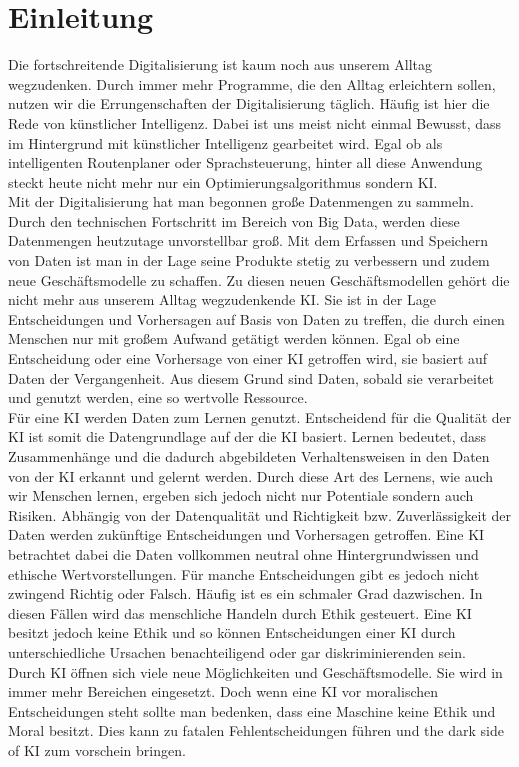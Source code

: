 \chapter{Einleitung}
\begin{onehalfspace}    
    \label{sec:einleitung}
        Die fortschreitende Digitalisierung ist kaum noch aus unserem Alltag wegzudenken. Durch immer mehr Programme, die den Alltag erleichtern sollen, nutzen wir die Errungenschaften der Digitalisierung täglich. Häufig ist hier die Rede von künstlicher Intelligenz. Dabei ist uns meist nicht einmal Bewusst, dass im Hintergrund mit künstlicher Intelligenz gearbeitet wird. Egal ob als intelligenten Routenplaner oder Sprachsteuerung, hinter all diese Anwendung steckt heute nicht mehr nur ein Optimierungsalgorithmus sondern \ac{KI}. 
        \\
        Mit der Digitalisierung hat man begonnen große Datenmengen zu sammeln. Durch den technischen Fortschritt im Bereich von Big Data, werden diese Datenmengen heutzutage unvorstellbar groß. Mit dem Erfassen und Speichern von Daten ist man in der Lage seine Produkte stetig zu verbessern und zudem neue Geschäftsmodelle zu schaffen. Zu diesen neuen Geschäftsmodellen gehört die nicht mehr aus unserem Alltag wegzudenkende \ac{KI}. Sie ist in der Lage Entscheidungen und Vorhersagen auf Basis von Daten zu treffen, die durch einen Menschen nur  mit großem Aufwand getätigt werden können.  Egal ob eine Entscheidung oder eine Vorhersage von einer \ac{KI} getroffen wird, sie basiert auf Daten der Vergangenheit. Aus diesem Grund sind Daten, sobald sie verarbeitet und genutzt werden, eine so wertvolle Ressource.
        \\
        Für eine \ac*{KI} werden Daten zum Lernen genutzt. Entscheidend für die Qualität der \ac*{KI} ist somit die Datengrundlage auf der die \ac*{KI} basiert. Lernen bedeutet, dass Zusammenhänge und die dadurch abgebildeten Verhaltensweisen in den Daten von der \ac*{KI} erkannt und gelernt werden. Durch diese Art des Lernens, wie auch wir Menschen lernen, ergeben sich jedoch nicht nur Potentiale sondern auch Risiken. Abhängig von der Datenqualität und Richtigkeit bzw. Zuverlässigkeit der Daten werden zukünftige Entscheidungen und Vorhersagen getroffen. Eine \ac*{KI} betrachtet dabei die Daten vollkommen neutral ohne Hintergrundwissen und ethische Wertvorstellungen. Für manche Entscheidungen gibt es jedoch nicht zwingend Richtig oder Falsch. Häufig ist es ein schmaler Grad dazwischen. In diesen Fällen wird das menschliche Handeln durch Ethik gesteuert. Eine \ac*{KI} besitzt jedoch keine Ethik und so können Entscheidungen einer KI durch unterschiedliche Ursachen benachteiligend oder gar diskriminierenden sein.
        \\
        Durch \ac*{KI} öffnen sich viele neue Möglichkeiten und Geschäftsmodelle. Sie wird in immer mehr Bereichen eingesetzt. Doch wenn eine \ac*{KI} vor moralischen Entscheidungen steht sollte man bedenken, dass eine Maschine keine Ethik und Moral besitzt. Dies kann zu fatalen Fehlentscheidungen führen und \glqq{}the dark side of \ac*{KI}\grqq{} zum vorschein bringen.


\end{onehalfspace}
